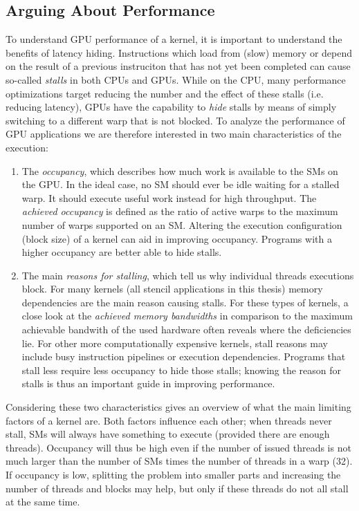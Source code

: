 \subsection{Arguing About Performance}

To understand GPU performance of a kernel, it is important to understand the benefits of latency hiding. Instructions which load from (slow) memory or depend on the result of a previous instruciton that has not yet been completed can cause so-called \emph{stalls} in both CPUs and GPUs. While on the CPU, many performance optimizations target reducing the number and the effect of these stalls (i.e. reducing latency), GPUs have the capability to \emph{hide} stalls by means of simply switching to a different warp that is not blocked. To analyze the performance of GPU applications we are therefore interested in two main characteristics of the execution:

\begin{enumerate}
	\item The \emph{occupancy}, which describes how much work is available to the SMs on the GPU. In the ideal case, no SM should ever be idle waiting for a stalled warp. It should execute useful work instead for high throughput. The \emph{achieved occupancy} is defined as the ratio of active warps to the maximum number of warps supported on an SM. Altering the execution configuration (block size) of a kernel can aid in improving occupancy. Programs with a higher occupancy are better able to hide stalls.
	\item The main \emph{reasons for stalling}, which tell us why individual threads executions block. For many kernels (all stencil applications in this thesis) memory dependencies are the main reason causing stalls. For these types of kernels, a close look at the \emph{achieved memory bandwidths} in comparison to the maximum achievable bandwith of the used hardware often reveals where the deficiencies lie. For other more computationally expensive kernels, stall reasons may include busy instruction pipelines or execution dependencies. Programs that stall less require less occupancy to hide those stalls; knowing the reason for stalls is thus an important guide in improving performance.
\end{enumerate}

Considering these two characteristics gives an overview of what the main limiting factors of a kernel are. Both factors influence each other; when threads never stall, SMs will always have something to execute (provided there are enough threads). Occupancy will thus be high even if the number of issued threads is not much larger than the number of SMs times the number of threads in a warp (32). If occupancy is low, splitting the problem into smaller parts and increasing the number of threads and blocks may help, but only if these threads do not all stall at the same time.

